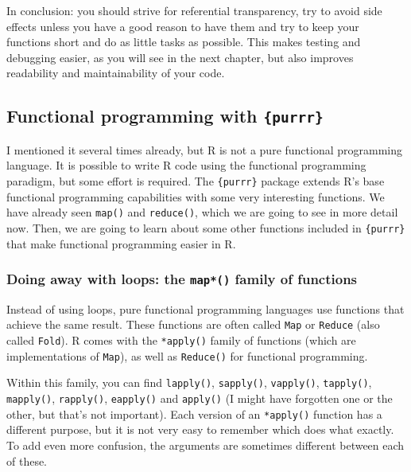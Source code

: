\documentclass[
]{article}
\begin{document}
In conclusion: you should strive for referential transparency, try to avoid side effects unless you
have a good reason to have them and try to keep your functions short and do as little tasks as
possible. This makes testing and debugging easier, as you will see in the next chapter, but also
improves readability and maintainability of your code.

\hypertarget{functional-programming-with-purrr}{%
\subsection{\texorpdfstring{Functional programming with \texttt{\{purrr\}}}{Functional programming with \{purrr\}}}\label{functional-programming-with-purrr}}

I mentioned it several times already, but R is not a pure functional programming language. It is
possible to write R code using the functional programming paradigm, but some effort is required.
The \texttt{\{purrr\}} package extends R's base functional programming capabilities with some very interesting
functions. We have already seen \texttt{map()} and \texttt{reduce()}, which we are going to see in more detail now.
Then, we are going to learn about some other functions included in \texttt{\{purrr\}} that make functional
programming easier in R.

\hypertarget{doing-away-with-loops-the-map-family-of-functions}{%
\subsubsection{\texorpdfstring{Doing away with loops: the \texttt{map*()} family of functions}{Doing away with loops: the map*() family of functions}}\label{doing-away-with-loops-the-map-family-of-functions}}

Instead of using loops, pure functional programming languages use functions that achieve
the same result. These functions are often called \texttt{Map} or \texttt{Reduce} (also called \texttt{Fold}). R comes
with the \texttt{*apply()} family of functions (which are implementations of \texttt{Map}),
as well as \texttt{Reduce()} for functional programming.

Within this family, you can find \texttt{lapply()}, \texttt{sapply()}, \texttt{vapply()}, \texttt{tapply()}, \texttt{mapply()}, \texttt{rapply()},
\texttt{eapply()} and \texttt{apply()} (I might have forgotten one or the other, but that's not important).
Each version of an \texttt{*apply()} function has a different purpose, but it is not very easy to
remember which does what exactly. To add even more confusion, the arguments are sometimes different between
each of these.
\end{document}
